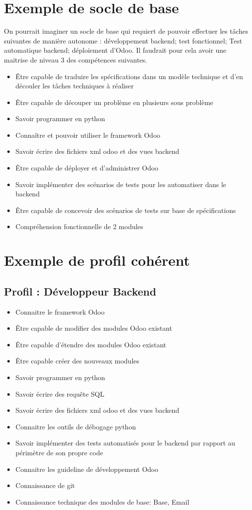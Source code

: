 \section{Exemple de socle de base}
On pourrait imaginer un socle de base qui requiert de pouvoir effectuer les tâches suivantes de manière autonome : développement backend; test fonctionnel; Test automatique backend; déploiement d'Odoo.
Il faudrait pour cela avoir une maitrise de niveau 3 des compétences suivantes. 
\begin{itemize}
 \item Être capable de traduire les spécifications dans un modèle technique et d'en découler les tâches techniques à réaliser
 \item Être capable de découper un problème en plusieurs sous problème
 \item Savoir programmer en python
 \item Connaître et pouvoir utiliser le framework Odoo
 \item Savoir écrire des fichiers xml odoo et des vues backend
 \item Être capable de déployer et d'administrer Odoo
 \item Savoir implémenter des scénarios de tests pour les automatiser dans le backend
 \item Être capable de concevoir des scénarios de tests sur base de spécifications
 \item Compréhension fonctionnelle de 2 modules
\end{itemize}


\section{Exemple de profil cohérent}
\subsection{Profil : Développeur Backend}
\begin{itemize}
 \item Connaitre le framework Odoo
 \item Être capable de modifier des modules Odoo existant
 \item Être capable d'étendre des modules Odoo existant
 \item Être capable créer des nouveaux modules
 \item Savoir programmer en python
 \item Savoir écrire des requête SQL
 \item Savoir écrire des fichiers xml odoo et des vues backend
 \item Connaitre les outils de débogage python
 \item Savoir implémenter des tests automatisés pour le backend par rapport au périmètre de son propre code
 \item Connaitre les guideline de développement Odoo
 \item Connaissance de git
 \item Connaissance technique des modules de base: Base, Email

\end{itemize}

